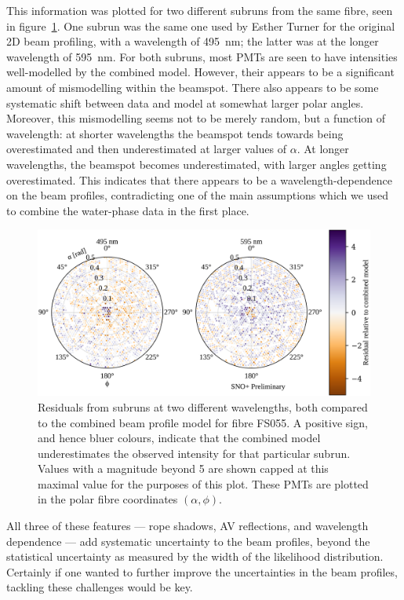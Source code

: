 This information was plotted for two different subruns from the same fibre, seen in figure~\ref{fig:llr}. One subrun was the same one used by Esther Turner for the original 2D beam profiling, with a wavelength of \SI{495}{\nano\metre}; the latter was at the longer wavelength of \SI{595}{\nano\metre}. For both subruns, most PMTs are seen to have intensities well-modelled by the combined model. However, their appears to be a significant amount of mismodelling within the beamspot. There also appears to be some systematic shift between data and model at somewhat larger polar angles. Moreover, this mismodelling seems not to be merely random, but a function of wavelength: at shorter wavelengths the beamspot tends towards being overestimated and then underestimated at larger values of $\alpha$. At longer wavelengths, the beamspot becomes underestimated, with larger angles getting overestimated. This indicates that there appears to be a wavelength-dependence on the beam profiles, contradicting one of the main assumptions which we used to combine the water-phase data in the first place.
\begin{figure}
    \centering
    \includegraphics[width=\textwidth]{4_SMELLIESimulation/images/residual_wavelength_comparison_data_model_nice.pdf}
    \caption[Residuals from subruns at two different wavelengths, both compared to the combined beam profile model for fibre FS055]{Residuals from subruns at two different wavelengths, both compared to the combined beam profile model for fibre FS055. A positive sign, and hence bluer colours, indicate that the combined model underestimates the observed intensity for that particular subrun. Values with a magnitude beyond 5 are shown capped at this maximal value for the purposes of this plot. These PMTs are plotted in the polar fibre coordinates $(\alpha,\phi)$.}
    \label{fig:llr}
\end{figure}
All three of these features --- rope shadows, AV reflections, and wavelength dependence --- add systematic uncertainty to the beam profiles, beyond the statistical uncertainty as measured by the width of the likelihood distribution. Certainly if one wanted to further improve the uncertainties in the beam profiles, tackling these challenges would be key.

